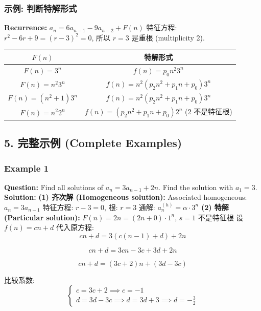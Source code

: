 \documentclass[10pt,a4paper,openany]{ctexbook}
\theoremstyle{definition}
\theoremstyle{remark}
\begin{document}
\subsubsection{示例: 判断特解形式}

\textbf{Recurrence:} $a_n = 6a_{n-1} - 9a_{n-2} + F(n)$
特征方程: $r^2 - 6r + 9 = (r-3)^2 = 0$, 所以 $r = 3$ 是重根 (multiplicity 2).
\begin{center}
\begin{tabular}{cc}
\hline
$F(n)$ & 特解形式 \\ \hline
$F(n) = 3^n$ & $f(n) = p_0 n^2 3^n$ \\
$F(n) = n^2 3^n$ & $f(n) = n^2(p_2 n^2 + p_1 n + p_0) 3^n$ \\
$F(n) = (n^2 + 1) 3^n$ & $f(n) = n^2(p_2 n^2 + p_1 n + p_0) 3^n$ \\
$F(n) = n^2 2^n$ & $f(n) = (p_2 n^2 + p_1 n + p_0) 2^n$ (2 不是特征根) \\
\hline
\end{tabular}

\end{center}

\vspace{-2pt}

\subsection{5. 完整示例 (Complete Examples)}

\subsubsection{Example 1}

\textbf{Question:} Find all solutions of $a_n = 3a_{n-1} + 2n$. Find the solution with $a_1 = 3$.
\textbf{Solution:}
\textbf{(1) 齐次解 (Homogeneous solution):}
Associated homogeneous: $a_n = 3a_{n-1}$
特征方程: $r - 3 = 0$, 根: $r = 3$
通解: $a_n^{(h)} = \alpha \cdot 3^n$
\textbf{(2) 特解 (Particular solution):}
$F(n) = 2n = (2n + 0) \cdot 1^n$, $s = 1$ 不是特征根
设 $f(n) = cn + d$
代入原方程:
\[
cn + d = 3(c(n-1) + d) + 2n
\]

\[
cn + d = 3cn - 3c + 3d + 2n
\]

\[
cn + d = (3c + 2)n + (3d - 3c)
\]

比较系数:
\[
\begin{cases}
c = 3c + 2 \implies c = -1 \\
d = 3d - 3c \implies d = 3d + 3 \implies d = -\frac{3}{2}
\end{cases}
\]
\end{document}
